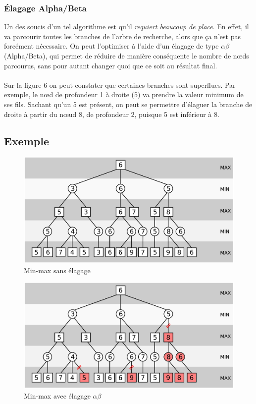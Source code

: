 \documentclass[a4paper,12pt]{article}
\begin{document}
\subsubsection{Élagage Alpha/Beta}
Un des soucis d'un tel algorithme est qu'il \emph{requiert beaucoup de place}. En effet, il va parcourir toutes les branches de l'arbre de recherche, alors que ça n'est pas forcément nécessaire. On peut l'optimiser à l'aide d'un élagage de type $\alpha\beta$ (Alpha/Beta), qui permet de réduire de manière conséquente le nombre de n\oe{}ds parcourus, sans pour autant changer quoi que ce soit au résultat final.
\\\\
Sur la figure 6 on peut constater que certaines branches sont superflues. Par exemple, le n\oe{}d de profondeur 1 à droite (5) va prendre la valeur minimum de ses fils. Sachant qu'un 5 est présent, on peut se permettre d'élaguer la branche de droite à partir du n\oe{}ud 8, de profondeur 2, puisque 5 est inférieur à 8.

\subsection{Exemple}
\begin{figure}[H]
    \centering
    \includegraphics[width=.8\textwidth]{./pix/minimax}
    \caption{Min-max sans élagage}
\end{figure}

\begin{figure}[H]
    \centering
    \includegraphics[width=.8\textwidth]{./pix/alphabeta}
    \caption{Min-max avec élagage $\alpha\beta$}
\end{figure}
\newpage
\end{document}
